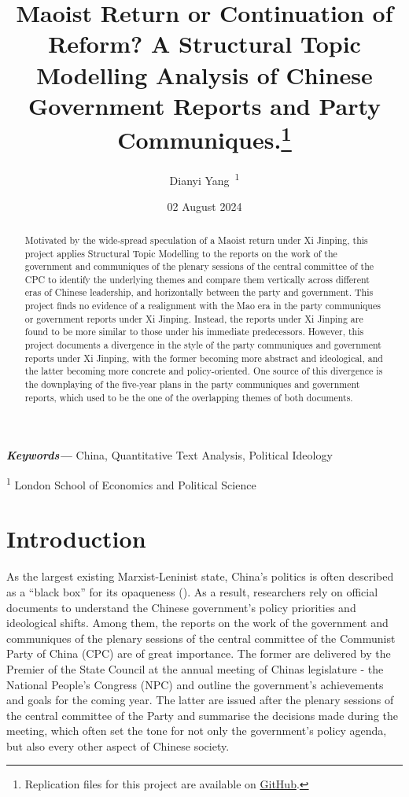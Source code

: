 \documentclass[
  letterpaper,
  abstract=true]{scrartcl}
\title{Maoist Return or Continuation of Reform? A Structural Topic
Modelling Analysis of Chinese Government Reports and Party
Communiques.\thanks{Replication files for this project are available on
\href{https://github.com/kv9898/maoist}{GitHub}.}}
\author{Dianyi Yang~\orcidlink{0009-0004-4652-3429}\textsuperscript{1}}
\date{02 August 2024}
\providecommand{\keywords}[1]
{
  \small	
  \textbf
{\textit{Keywords---}} #1
}
\begin{document}
\maketitle
\begin{abstract}
Motivated by the wide-spread speculation of a Maoist return under Xi
Jinping, this project applies Structural Topic Modelling to the reports
on the work of the government and communiques of the plenary sessions of
the central committee of the CPC to identify the underlying themes and
compare them vertically across different eras of Chinese leadership, and
horizontally between the party and government. This project finds no
evidence of a realignment with the Mao era in the party communiques or
government reports under Xi Jinping. Instead, the reports under Xi
Jinping are found to be more similar to those under his immediate
predecessors. However, this project documents a divergence in the style
of the party communiques and government reports under Xi Jinping, with
the former becoming more abstract and ideological, and the latter
becoming more concrete and policy-oriented. One source of this
divergence is the downplaying of the five-year plans in the party
communiques and government reports, which used to be the one of the
overlapping themes of both documents.
\end{abstract}
\begin{center}
\keywords{China, Quantitative Text Analysis, Political Ideology}
\end{center}




\textsuperscript{1} London School of Economics and Political Science

\newpage

\section{Introduction}\label{introduction}

As the largest existing Marxist-Leninist state, China's politics is
often described as a ``black box'' for its opaqueness
(). As a result,
researchers rely on official documents to understand the Chinese
government's policy priorities and ideological shifts. Among them, the
reports on the work of the government and communiques of the plenary
sessions of the central committee of the Communist Party of China (CPC)
are of great importance. The former are delivered by the Premier of the
State Council at the annual meeting of Chinas legislature - the National
People's Congress (NPC) and outline the government's achievements and
goals for the coming year. The latter are issued after the plenary
sessions of the central committee of the Party and summarise the
decisions made during the meeting, which often set the tone for not only
the government's policy agenda, but also every other aspect of Chinese
society.
\end{document}
